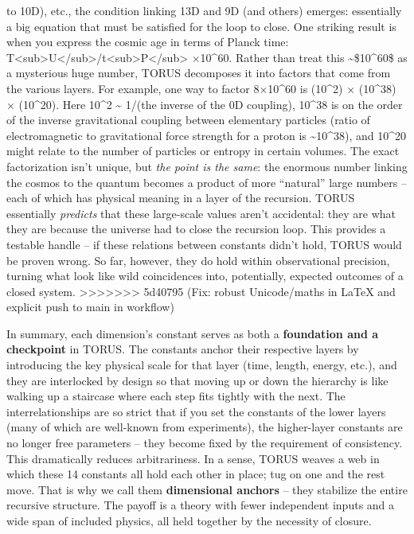 \documentclass[]{article}
\begin{document}
{\begin{itemize}
  to 10D), etc., the condition linking 13D and 9D (and others) emerges:
  essentially a big equation that must be satisfied for the loop to
  close. One striking result is when you express the cosmic age in terms
  of Planck time:
  T\textless{}sub\textgreater{}U\textless{}/sub\textgreater{}/t\textless{}sub\textgreater{}P\textless{}/sub\textgreater{}
  ×10\^{}60​. Rather than treat this \textasciitilde{}\$10\^{}60\$ as
  a mysterious huge number, TORUS decomposes it into factors that come
  from the various layers​. For example, one way to factor 8×10\^{}60 is
  (10\^{}2) × (10\^{}38) × (10\^{}20)​. Here 10\^{}2 \textasciitilde{}
  1/\alpha (the inverse of the 0D coupling), 10\^{}38 is on the order of the
  inverse gravitational coupling between elementary particles (ratio of
  electromagnetic to gravitational force strength for a proton is
  \textasciitilde{}10\^{}38), and 10\^{}20 might relate to the number of
  particles or entropy in certain volumes​. The exact factorization
  isn't unique, but \emph{the point is the same}: the enormous number
  linking the cosmos to the quantum becomes a product of more
  ``natural'' large numbers -- each of which has physical meaning in a
  layer of the recursion​. TORUS essentially \emph{predicts} that these
  large-scale values aren't accidental: they are what they are because
  the universe had to close the recursion loop. This provides a testable
  handle -- if these relations between constants didn't hold, TORUS
  would be proven wrong​. So far, however, they do hold within
  observational precision, turning what look like wild coincidences
  into, potentially, expected outcomes of a closed system.
>>>>>>> 5d40795 (Fix: robust Unicode/maths in LaTeX and explicit push to main in workflow)
\end{itemize}

In summary, each dimension's constant serves as both a
\textbf{foundation and a checkpoint} in TORUS. The constants anchor
their respective layers by introducing the key physical scale for that
layer (time, length, energy, etc.), and they are interlocked by design
so that moving up or down the hierarchy is like walking up a staircase
where each step fits tightly with the next. The interrelationships are
so strict that if you set the constants of the lower layers (many of
which are well-known from experiments), the higher-layer constants are
no longer free parameters -- they become fixed by the requirement of
consistency​. This dramatically reduces arbitrariness. In a sense, TORUS
weaves a web in which these 14 constants all hold each other in place;
tug on one and the rest move. That is why we call them
\textbf{dimensional anchors} -- they stabilize the entire recursive
structure. The payoff is a theory with fewer independent inputs and a
wide span of included physics, all held together by the necessity of
closure.

}
\end{document}
